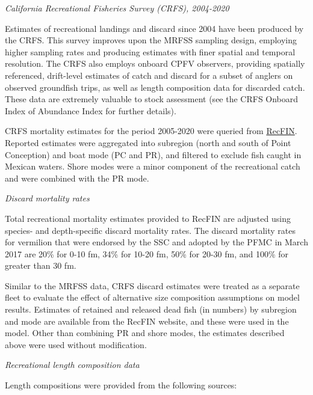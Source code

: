 \documentclass[
  english,
  a4paper,
]{article}
\begin{document}
\emph{California Recreational Fisheries Survey (CRFS), 2004-2020}

Estimates of recreational landings and discard since 2004 have been produced by
the CRFS. This survey improves upon the MRFSS sampling design, employing higher
sampling rates and producing estimates with finer spatial and temporal resolution.
The CRFS also employs onboard CPFV observers, providing spatially referenced,
drift-level estimates of catch and discard for a subset of anglers on observed
groundfish trips, as well as length composition data for discarded catch. These
data are extremely valuable to stock assessment (see the CRFS Onboard Index of
Abundance Index for
further details).

CRFS mortality estimates for the period 2005-2020 were queried from
\href{www.recfin.org}{RecFIN}. Reported estimates were aggregated into subregion
(north and south of Point Conception) and boat mode (PC and PR), and filtered
to exclude fish caught in Mexican waters. Shore modes were a minor component
of the recreational catch and were combined with the PR mode.

\emph{Discard mortality rates}

Total recreational mortality estimates provided to RecFIN are
adjusted using species- and depth-specific discard mortality rates.
The discard mortality rates for vermilion that were endorsed by the
SSC and adopted by the
PFMC in March 2017 are 20\% for 0-10 fm, 34\% for 10-20 fm, 50\% for 20-30 fm, and
100\% for greater than 30 fm.

Similar to the MRFSS data, CRFS discard estimates were treated as a separate
fleet to evaluate the effect of alternative size composition assumptions on
model results. Estimates of retained and released dead fish (in numbers) by
subregion and mode are available from the RecFIN website, and these were used
in the model. Other than combining PR and shore modes, the estimates described
above were used without modification.

\emph{Recreational length composition data}

Length compositions were provided from the following sources:
\end{document}
